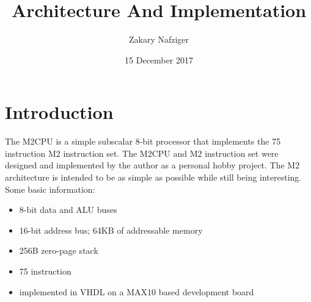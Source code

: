 \documentclass[a4paper,12pt]{article}
\title{\mt{} Architecture And Implementation}
\author{Zakary Nafziger}
\date{15 December 2017}
\newcommand{\mt}{M2CPU}
\newcommand{\mi}{M2 instruction set}
\newcommand{\ma}{M2 architecture}
\begin{document}
\maketitle
{}
\newpage


\section{Introduction}
The \mt{} is a simple subscalar 8-bit processor that implements the 75 
instruction \mi{}. The \mt{} and \mi{} were designed and implemented by the author
as a personal hobby project. The \ma{} is intended to be as simple as possible 
while still being interesting. Some basic information:

\begin{itemize}
\item 8-bit data and ALU buses
\item 16-bit address bus; 64KB of addressable memory
\item 256B zero-page stack
\item 75 instruction
\item implemented in VHDL on a MAX10 based development board
\end{itemize}
\end{document}
